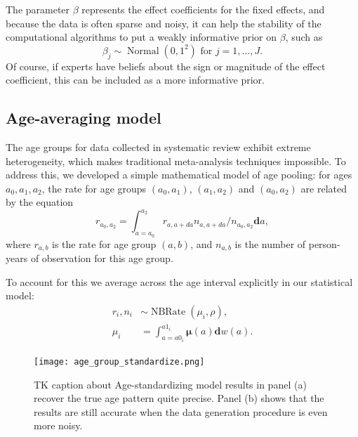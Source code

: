 \documentclass[12pt]{article}
\newcommand{\1}{\mathbf{1}}
\newcommand{\0}{\mathbf{0}}
\renewcommand{\d}{\mathbf{d}}
\newcommand{\Normal}{\operatorname{Normal}}
\newcommand{\NBRate}{\operatorname{NBRate}}
\def\boldmu{\boldsymbol{\mu}}
\begin{document}
The parameter $\beta$ represents the effect coefficients for
the fixed effects, and because the data is often sparse and noisy, it
can help the stability of the computational algorithms to put a weakly
informative prior on $\beta$, such as
\[
\beta_j \sim \Normal\left(0, 1^2\right) \text{ for } j = 1, \ldots, J.
\]
Of course, if experts have beliefs about the sign or magnitude of the
effect coefficient, this can be included as a more informative prior.


\subsection{Age-averaging model}
The age groups for data collected in systematic review exhibit extreme
heterogeneity, which makes traditional meta-analysis techniques
impossible.  To address this, we developed a simple mathematical model
of age pooling:
for ages $a_0, a_1, a_2$, the rate for age groups $(a_0,a_1)$, $(a_1, a_2)$ and $(a_0, a_2)$ are related by the equation
\[
r_{a_0,a_2} = \int_{a=a_0}^{a_2} r_{a,a+da}n_{a,a+da}/n_{a_0,a_2}\d a,
\]
where $r_{a,b}$ is the rate for age group $(a,b)$, and $n_{a,b}$ is
the number of person-years of observation for this age group.

To account for this we average across the age interval explicitly in
our statistical model:
\begin{align*}
r_i, n_i &\sim \NBRate\left(\mu_i, \rho\right),\\
\mu_i &= \int_{a=a0_i}^{a1_i} \boldmu(a)\d w(a).
\end{align*}

\begin{figure}[h]
\begin{center}
\texttt{[image: age\_group\_standardize.png]}
\caption{TK caption about Age-standardizing model results in panel (a)
  recover the true age pattern quite precise. Panel (b) shows that the
  results are still accurate when the data generation procedure is
  even more noisy.}
\label{age-group-standardize}
\end{center}
\end{figure}
\end{document}
